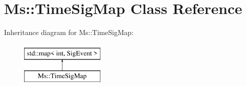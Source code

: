 \hypertarget{class_ms_1_1_time_sig_map}{}\section{Ms\+:\+:Time\+Sig\+Map Class Reference}
\label{class_ms_1_1_time_sig_map}
Inheritance diagram for Ms\+:\+:Time\+Sig\+Map\+:\begin{figure}[H]
\begin{center}
\leavevmode
\includegraphics[height=2.000000cm]{class_ms_1_1_time_sig_map}
\end{center}
\end{figure}
